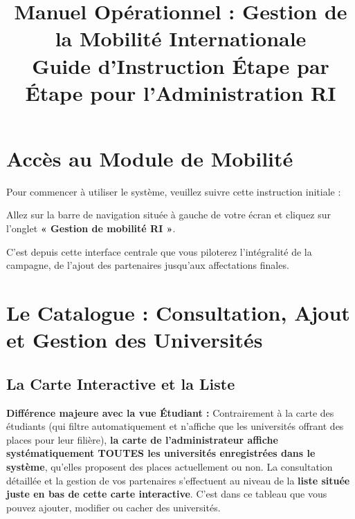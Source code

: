 \documentclass[12pt,a4paper]{article}
\title{\textbf{Manuel Opérationnel : Gestion de la Mobilité Internationale}\\ \large Guide d'Instruction Étape par Étape pour l'Administration RI}
\begin{document}
\maketitle
\tableofcontents
\newpage

\section{Accès au Module de Mobilité}
Pour commencer à utiliser le système, veuillez suivre cette instruction initiale :
\begin{tcolorbox}[colback=blue!5!white,colframe=blue!75!black,title=Action]
Allez sur la barre de navigation située à gauche de votre écran et cliquez sur l'onglet \textbf{« Gestion de mobilité RI »}.
\end{tcolorbox}
C'est depuis cette interface centrale que vous piloterez l'intégralité de la campagne, de l'ajout des partenaires jusqu'aux affectations finales.

\section{Le Catalogue : Consultation, Ajout et Gestion des Universités}
\subsection{La Carte Interactive et la Liste}
\textbf{Différence majeure avec la vue Étudiant :} Contrairement à la carte des étudiants (qui filtre automatiquement et n'affiche que les universités offrant des places pour leur filière), \textbf{la carte de l'administrateur affiche systématiquement TOUTES les universités enregistrées dans le système}, qu'elles proposent des places actuellement ou non.
\newline La consultation détaillée et la gestion de vos partenaires s'effectuent au niveau de la \textbf{liste située juste en bas de cette carte interactive}. C'est dans ce tableau que vous pouvez ajouter, modifier ou cacher des universités.
\end{document}
